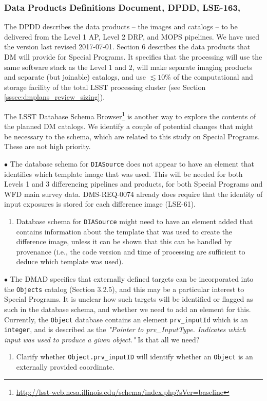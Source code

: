 \documentclass[DM,lsstdraft,toc]{lsstdoc}
\begin{document}
\subsubsection{Data Products Definitions Document, DPDD, LSE-163, \cite{LSE-163}}\label{sssec:dmplans_review_dpdd}

The DPDD describes the data products -- the images and catalogs -- to be delivered from the Level 1 AP, Level 2 DRP, and MOPS pipelines. We have used the version last revised 2017-07-01. Section 6 describes the data products that DM will provide for Special Programs. It specifies that the processing will use the same software stack as the Level 1 and 2, will make separate imaging products and separate (but joinable) catalogs, and use $\lesssim10\%$ of the computational and storage facility of the total LSST processing cluster (see Section \ref{sssec:dmplans_review_sizing}). 

The LSST Database Schema Browser\footnote{\url{http://lsst-web.ncsa.illinois.edu/schema/index.php?sVer=baseline}} is another way to explore the contents of the planned DM catalogs. We identify a couple of potential changes that might be necessary to the schema, which are related to this study on Special Programs. These are not high priority.

$\bullet$ The database schema for {\tt DIASource} does not appear to have an element that identifies which template image that was used. This will be needed for both Levels 1 and 3 differencing pipelines and products, for both Special Programs and WFD main survey data. DMS-REQ-0074 already does require that the identity of input exposures is stored for each difference image (LSE-61).
\begin{enumerate}[resume,topsep=-10pt,label= \textbf{Concern \Roman*.}] \item \label{C8} Database schema for {\tt DIASource} might need to have an element added that contains information about the template that was used to create the difference image, unless it can be shown that this can be handled by provenance (i.e., the code version and time of processing are sufficient to deduce which template was used). \end{enumerate}

$\bullet$ The DMAD specifies that externally defined targets can be incorporated into the {\tt Objects} catalog (Section 3.2.5), and this may be a particular interest to Special Programs. It is unclear how such targets will be identified or flagged as such in the database schema, and whether we need to add an element for this. Currently, the {\tt Object} database contains an element {\tt prv\_inputId} which is an {\tt integer}, and is described as the {\it "Pointer to prv\_InputType. Indicates which input was used to produce a given object."} Is that all we need? \\
\begin{enumerate}[resume,topsep=-10pt,label= \textbf{Concern \Roman*.}] \item \label{C9} Clarify whether {\tt Object.prv\_inputID} will identify whether an {\tt Object} is an externally provided coordinate. \end{enumerate}
\end{document}
